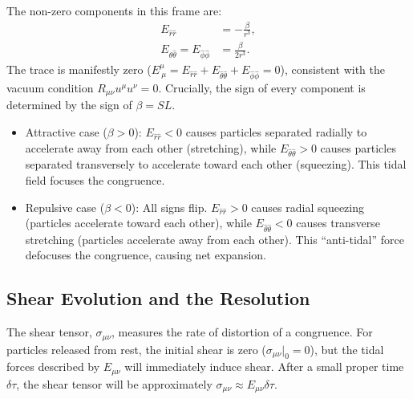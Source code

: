 \documentclass[%
  reprint,
  superscriptaddress,
  showpacs,
  showkeys,
  amsmath,amssymb,
  pra,
  longbibliography,
  floatfix,
]{revtex4-2}
\begin{document}
The non-zero components in this frame are:
\begin{align}
E_{\hat{r}\hat{r}} &= -\frac{\beta}{r^3}, \\
E_{\hat{\theta}\hat{\theta}} = E_{\hat{\phi}\hat{\phi}} &= \frac{\beta}{2r^3}.
\end{align}
The trace is manifestly zero ($E^\mu_{\ \mu} = E_{\hat{r}\hat{r}} + E_{\hat{\theta}\hat{\theta}} + E_{\hat{\phi}\hat{\phi}} = 0$), consistent with the vacuum condition $R_{\mu\nu}u^\mu u^\nu = 0$. Crucially, the sign of every component is determined by the sign of $\beta = SL$.

\begin{itemize}
    \item {Attractive case ($\beta > 0$):} $E_{\hat{r}\hat{r}} < 0$ causes particles separated radially to accelerate away from each other (stretching), while $E_{\hat{\theta}\hat{\theta}} > 0$ causes particles separated transversely to accelerate toward each other (squeezing). This tidal field focuses the congruence.
    \item {Repulsive case ($\beta < 0$):} All signs flip. $E_{\hat{r}\hat{r}} > 0$ causes radial squeezing (particles accelerate toward each other), while $E_{\hat{\theta}\hat{\theta}} < 0$ causes transverse stretching (particles accelerate away from each other). This ``anti-tidal'' force defocuses the congruence, causing net expansion.
\end{itemize}

\subsection{Shear Evolution and the Resolution}
The shear tensor, $\sigma_{\mu\nu}$, measures the rate of distortion of a congruence. For particles released from rest, the initial shear is zero ($\sigma_{\mu\nu}|_0 = 0$), but the tidal forces described by $E_{\mu\nu}$ will immediately induce shear. After a small proper time $\delta\tau$, the shear tensor will be approximately $\sigma_{\mu\nu} \approx E_{\mu\nu} \delta\tau$.
\end{document}
